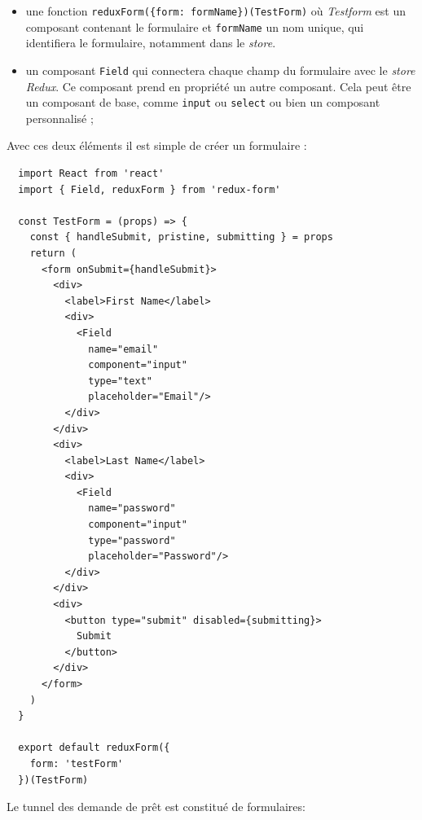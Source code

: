\documentclass[12pt,a4paper]{article}
\providecommand{\tightlist}{%
  \setlength{\itemsep}{0pt}\setlength{\parskip}{0pt}}
\begin{document}
  \begin{itemize}
  \tightlist
  \item
    une fonction
    \texttt{reduxForm(\{form:\ \textquotesingle{}formName\textquotesingle{}\})(TestForm)}
    où \emph{Testform} est un composant contenant le formulaire et
    \texttt{formName} un nom unique, qui identifiera le formulaire,
    notamment dans le \emph{store}.
  \item
    un composant \texttt{Field} qui connectera chaque champ du formulaire
    avec le \emph{store Redux}. Ce composant prend en propriété un autre
    composant. Cela peut être un composant de base, comme \texttt{input}
    ou \texttt{select} ou bien un composant personnalisé ;
  \end{itemize}

  Avec ces deux éléments il est simple de créer un formulaire :

  \begin{verbatim}
  import React from 'react'
  import { Field, reduxForm } from 'redux-form'

  const TestForm = (props) => {
    const { handleSubmit, pristine, submitting } = props
    return (
      <form onSubmit={handleSubmit}>
        <div>
          <label>First Name</label>
          <div>
            <Field
              name="email"
              component="input"
              type="text"
              placeholder="Email"/>
          </div>
        </div>
        <div>
          <label>Last Name</label>
          <div>
            <Field
              name="password"
              component="input"
              type="password"
              placeholder="Password"/>
          </div>
        </div>
        <div>
          <button type="submit" disabled={submitting}>
            Submit
          </button>
        </div>
      </form>
    )
  }

  export default reduxForm({
    form: 'testForm'
  })(TestForm)
  \end{verbatim}

  \bigskip

  Le tunnel des demande de prêt est constitué de formulaires:
\end{document}
